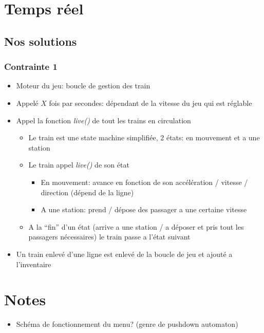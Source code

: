 \documentclass[report, backcover, french, nodocumentinfo]{upmethodology-document}
\begin{document}
		\section{Temps réel}
			\subsection{Nos solutions}
				\subsubsection{Contrainte 1}
					\begin{itemize}
						\item Moteur du jeu: boucle de gestion des train
						\item Appelé $X$ fois par secondes: dépendant de la vitesse du jeu qui est réglable
						\item Appel la fonction \textit{live()} de tout les trains en circulation
							\begin{itemize}
								\item Le train est une state machine simplifiée, 2 états: en mouvement et a une station
								\item Le train appel \textit{live()} de son état
									\begin{itemize}
										\item En mouvement: avance en fonction de son accélération / vitesse / direction (dépend de la ligne)
										\item A une station: prend / dépose des passager a une certaine vitesse
									\end{itemize}
								\item A la ``fin'' d'un état (arrive a une station / a déposer et pris tout les passagers nécessaires) le train passe a l'état suivant
							\end{itemize}
						\item Un train enlevé d'une ligne est enlevé de la boucle de jeu et ajouté a l'inventaire
					\end{itemize}
		\section{Notes}
			\begin{itemize}
				\item Schéma de fonctionnement du menu? (genre de pushdown automaton)
			\end{itemize}
\end{document}
